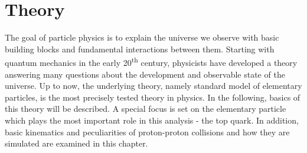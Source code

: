 \chapter{Theory}
\label{ch:Theo}
	The goal of particle physics is to explain the universe we observe with basic building blocks and fundamental interactions between them. Starting with quantum mechanics in the early 20\textsuperscript{th} century, physicists have developed a theory answering many questions about the development and observable state of the universe. Up to now, the underlying theory, namely standard model of elementary particles, is the most precisely tested theory in physics. In the following, basics of this theory will be described. A special focus is set on the elementary particle which plays the most important role in this analysis - the top quark. In addition, basic kinematics and peculiarities of proton-proton collisions and how they are simulated are examined in this chapter. 
